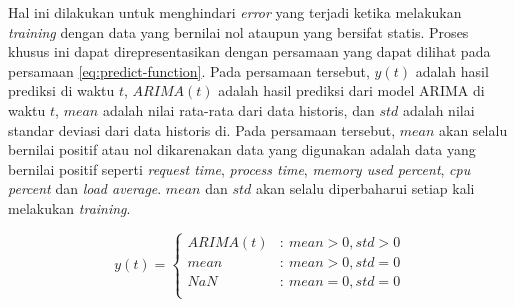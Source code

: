 Hal ini dilakukan untuk menghindari \textit{error} yang terjadi ketika melakukan \textit{training} dengan data yang bernilai nol ataupun yang bersifat statis. Proses khusus ini dapat direpresentasikan dengan persamaan yang dapat dilihat pada persamaan \ref{eq:predict-function}. Pada persamaan tersebut, $y(t)$ adalah hasil prediksi di waktu $t$, $ARIMA(t)$ adalah hasil prediksi dari model ARIMA di waktu $t$, $mean$ adalah nilai rata-rata dari data historis, dan $std$ adalah nilai standar deviasi dari data historis di. Pada persamaan tersebut, $mean$ akan selalu bernilai positif atau nol dikarenakan data yang digunakan adalah data yang bernilai positif seperti \textit{request time}, \textit{process time}, \textit{memory used percent}, \textit{cpu percent} dan \textit{load average}. $mean$ dan $std$ akan selalu diperbaharui setiap kali melakukan \textit{training}.

\begin{equation}
    \label{eq:predict-function}
    y(t) = \left\{
        \begin{array}{cl}
            ARIMA(t) & : \ mean > 0, std > 0 \\
            mean & : \ mean > 0, std = 0 \\
            NaN & : \ mean = 0, std = 0 \\
        \end{array}
    \right.
\end{equation}